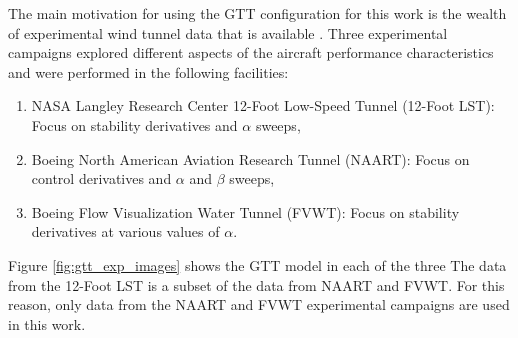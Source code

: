 The main motivation for using the GTT configuration for this work is the wealth of experimental wind tunnel data that is available \cite{cunningham_generic_2018,cunningham_preliminary_2018}. 
Three experimental campaigns explored different aspects of the aircraft performance characteristics and were performed in the following facilities:
\begin{enumerate}
    \item NASA Langley Research Center 12-Foot Low-Speed Tunnel (12-Foot LST): Focus on stability derivatives and $\alpha$ sweeps,
    \item Boeing North American Aviation Research Tunnel (NAART): Focus on control derivatives and $\alpha$ and $\beta$ sweeps,
    \item Boeing Flow Visualization Water Tunnel (FVWT): Focus on stability derivatives at various values of $\alpha$.
\end{enumerate}
Figure \ref{fig:gtt_exp_images} shows the GTT model in each of the three 
The data from the 12-Foot LST is a subset of the data from NAART and FVWT. 
For this reason, only data from the NAART and FVWT experimental campaigns are used in this work. 

